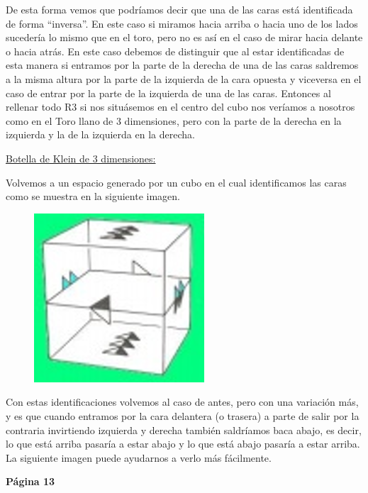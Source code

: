\begin{enumerate}
De esta forma vemos que podríamos decir que una de las caras está identificada de forma ``inversa''. En este caso si miramos hacia arriba o hacia uno de los lados sucedería lo mismo que en el toro, pero no es así en el caso de mirar hacia delante o hacia atrás. En este caso debemos de distinguir que al estar identificadas de esta manera si entramos por la parte de la derecha de una de las caras saldremos a la misma altura por la parte de la izquierda de la cara opuesta y viceversa en el caso de entrar por la parte de la izquierda de una de las caras. Entonces al rellenar todo R3 si nos situásemos en el centro del cubo nos veríamos a nosotros como en el Toro llano de 3 dimensiones, pero con la parte de la derecha en la izquierda y la de la izquierda en la derecha. 

\underline{Botella de Klein de 3 dimensiones:}

Volvemos a un espacio generado por un cubo en el cual identificamos las caras como se muestra en la siguiente imagen.

\begin{figure}[H]
\centering
\includegraphics[scale=0.5]{images/geometria_universo/pagina_9_3.png}
\end{figure}

Con estas identificaciones volvemos al caso de antes, pero con una variación más, y es que cuando entramos por la cara delantera (o trasera) a parte de salir por la contraria invirtiendo izquierda y derecha también saldríamos baca abajo, es decir, lo que está arriba pasaría a estar abajo y lo que está abajo pasaría a estar arriba. La siguiente imagen puede ayudarnos a verlo más fácilmente.

\end{enumerate}

\vspace{0.5cm}

\textbf{Página 13}

